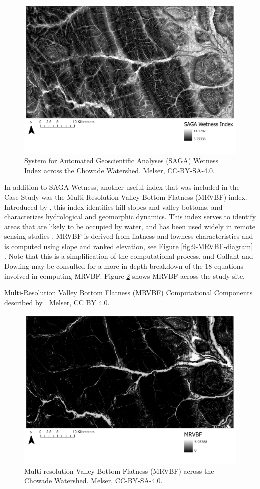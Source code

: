 \documentclass[
]{book}
\begin{document}
\begin{figure}
\includegraphics[width=0.75\linewidth]{images/09-SAGA-Wetness} \caption{System for Automated Geoscientific Analyses (SAGA) Wetness Index across the Chowade Watershed. Melser, CC-BY-SA-4.0.}\label{fig:9-SAGA-Wetness}
\end{figure}

In addition to SAGA Wetness, another useful index that was included in the Case Study was the Multi-Resolution Valley Bottom Flatness (MRVBF) index. Introduced by \citep{gallant_multiresolution_2003}, this index identifies hill slopes and valley bottoms, and characterizes hydrological and geomorphic dynamics. This index serves to identify areas that are likely to be occupied by water, and has been used widely in remote sensing studies \citep{huang_comparison_2017}. MRVBF is derived from flatness and lowness characteristics and is computed using slope and ranked elevation, see Figure \ref{fig:9-MRVBF-diagram} \citep{gallant_multiresolution_2003}. Note that this is a simplification of the computational process, and Gallant and Dowling may be consulted for a more in-depth breakdown of the 18 equations involved in computing MRVBF. Figure \ref{fig:9-MRVBF} shows MRVBF across the study site.

\label{fig:9-MRVBF-diagram}Multi-Resolution Valley Bottom Flatness (MRVBF) Computational Components described by \citet{gallant_multiresolution_2003}. Melser, CC BY 4.0.

\begin{figure}
\includegraphics[width=0.75\linewidth]{images/09-MRVBF} \caption{Multi-resolution Valley Bottom Flatness (MRVBF) across the Chowade Watershed. Melser, CC-BY-SA-4.0.}\label{fig:9-MRVBF}
\end{figure}
\end{document}
